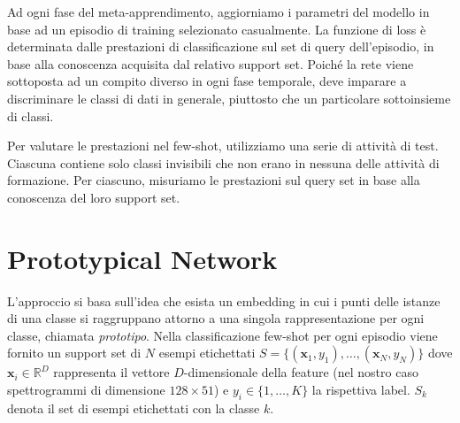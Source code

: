 \documentclass[12pt,a4paper,titlepage]{article}
\begin{document}
Ad ogni fase del meta-apprendimento, aggiorniamo i parametri del modello in base ad un episodio di training selezionato casualmente. La funzione di loss è determinata dalle prestazioni di classificazione sul set di query dell'episodio, in base alla conoscenza acquisita dal relativo support set. Poiché la rete viene sottoposta ad un compito diverso in ogni fase temporale, deve imparare a discriminare le classi di dati in generale, piuttosto che un particolare sottoinsieme di classi.

Per valutare le prestazioni nel few-shot, utilizziamo una serie di attività di test. Ciascuna contiene solo classi invisibili che non erano in nessuna delle attività di formazione. Per ciascuno, misuriamo le prestazioni sul query set in base alla conoscenza del loro support set.



\section{Prototypical Network}
L'approccio si basa sull'idea che esista un embedding in cui i punti delle istanze di una classe si raggruppano attorno a una singola rappresentazione per ogni classe, chiamata \textit{prototipo}. 
Nella classificazione few-shot per ogni episodio viene fornito un support set di $N$ esempi etichettati  $S=\{(\mathbf{x}_1,y_1), \dots,(\mathbf{x}_N,y_N)\}$ dove $\mathbf{x}_i\in \mathbb{R}^D$ rappresenta il vettore $D$-dimensionale della feature (nel nostro caso spettrogrammi di dimensione $128 \times 51$) e $y_i \in \{1, \dots, K\}$ la rispettiva label. $S_k$ denota il set di esempi etichettati con la classe $k$.
\end{document}
